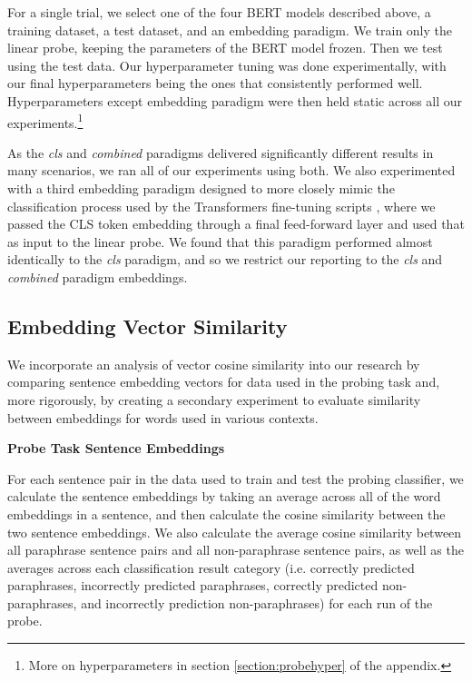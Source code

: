 \documentclass[11pt,a4paper]{article}
\begin{document}
For a single trial, we select one of the four BERT models described above, a training dataset, a test dataset, and an embedding paradigm. We train only the linear probe, keeping the parameters of the BERT model frozen. Then we test using the test data. Our hyperparameter tuning was done experimentally, with our final hyperparameters being the ones that consistently performed well. Hyperparameters except embedding paradigm were then held static across all our experiments.\footnote{More on hyperparameters in section \ref{section:probehyper} of the appendix.}

As the \textit{cls} and \textit{combined} paradigms delivered significantly different results in many scenarios, we ran all of our experiments using both. We also experimented with a third embedding paradigm designed to more closely mimic the classification process used by the Transformers fine-tuning scripts \cite{Wolf2019HuggingFacesTS}, where we passed the CLS token embedding through a final feed-forward layer and used that as input to the linear probe. We found that this paradigm performed almost identically to the \textit{cls} paradigm, and so we restrict our reporting to the \textit{cls} and \textit{combined} paradigm embeddings.

\subsection{Embedding Vector Similarity}

We incorporate an analysis of vector cosine similarity into our research by comparing sentence embedding vectors for data used in the probing task and, more rigorously, by creating a secondary experiment to evaluate similarity between embeddings for words used in various contexts.

\vspace{2mm}
\noindent \textbf{Probe Task Sentence Embeddings}

 \noindent 
 For each sentence pair in the data used to train and test the probing classifier, we calculate the sentence embeddings by taking an average across all of the word embeddings in a sentence, and then calculate the cosine similarity between the two sentence embeddings. We also calculate the average cosine similarity between all paraphrase sentence pairs and all non-paraphrase sentence pairs, as well as the averages across each classification result category (i.e.  correctly predicted paraphrases, incorrectly predicted paraphrases, correctly predicted non-paraphrases, and incorrectly prediction non-paraphrases) for each run of the probe.
\end{document}
